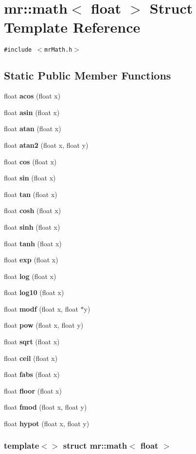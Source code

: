 \section{mr::math$<$ float $>$ Struct Template Reference}
\label{structmr_1_1math_3_01float_01_4}
{\tt \#include $<$mr\-Math.h$>$}

\subsection*{Static Public Member Functions}
\begin{CompactItemize}
\item 
float {\bf acos} (float x)
\item 
float {\bf asin} (float x)
\item 
float {\bf atan} (float x)
\item 
float {\bf atan2} (float x, float y)
\item 
float {\bf cos} (float x)
\item 
float {\bf sin} (float x)
\item 
float {\bf tan} (float x)
\item 
float {\bf cosh} (float x)
\item 
float {\bf sinh} (float x)
\item 
float {\bf tanh} (float x)
\item 
float {\bf exp} (float x)
\item 
float {\bf log} (float x)
\item 
float {\bf log10} (float x)
\item 
float {\bf modf} (float x, float $\ast$y)
\item 
float {\bf pow} (float x, float y)
\item 
float {\bf sqrt} (float x)
\item 
float {\bf ceil} (float x)
\item 
float {\bf fabs} (float x)
\item 
float {\bf floor} (float x)
\item 
float {\bf fmod} (float x, float y)
\item 
float {\bf hypot} (float x, float y)
\end{CompactItemize}
\subsubsection*{template$<$$>$ struct mr::math$<$ float $>$}



